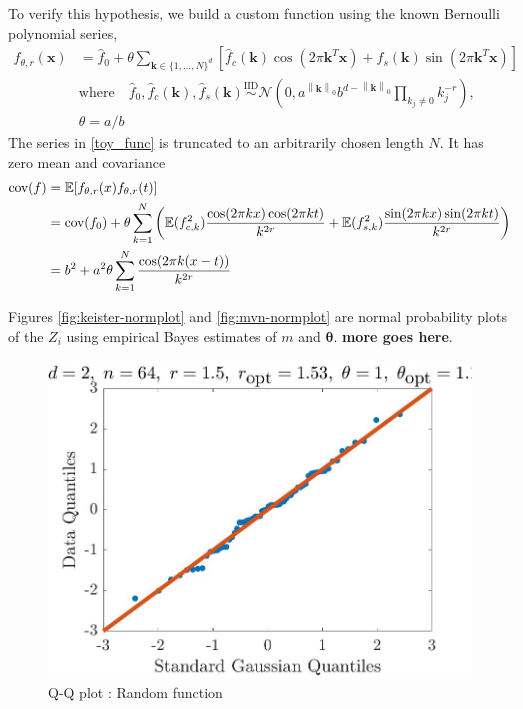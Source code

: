 \documentclass{svjour3}                     %
\newcommand{\bm}[1]{\boldsymbol{#1}}
\newcommand{\Ex}{\mathbb{E}}
\newcommand{\vtheta}{{\bm{\theta}}}
\newcommand{\vk}{\bm{k}}
\newcommand{\vx}{\bm{x}}
\newcommand{\cov}{{\textup{cov}}}
\newcommand{\calN}{\mathcal{N}}
\newcommand{\norm}[2][{}]{\ensuremath{\left \lVert #2 \right \rVert}_{#1}}
\begin{document}
To verify this hypothesis, we build a custom function using the known Bernoulli polynomial series,
\begin{align}
\label{toy_func}
f_{\theta, r}(\vx) & = \widehat{f}_0 + \theta \sum_{\vk \in \lbrace 1, \dots, N \rbrace^d}
\left[\widehat{f}_{c}(\vk) \cos(2\pi \vk^T \vx) + \widehat{f}_{s}(\vk) \sin(2\pi \vk^T \vx)\right]
\\
\nonumber
& \text{where} \quad 
\widehat{f}_0, \widehat{f}_{c}(\vk), \widehat{f}_{s}(\vk) \overset{\text{IID}}{\sim} \calN(0, a^{\norm[0]{\vk}} b^{d-\norm[0]{\vk}} \prod_{k_j \ne 0} k_j^{-r} ), 
\\
\nonumber
&\theta = a/b
\end{align}
The series in \eqref{toy_func} is truncated to an arbitrarily chosen length $N$. It has zero mean and covariance
\begin{align*}
\cov(f) &= \Ex[f_{\theta, r}(x) f_{\theta, r}(t)] \\
&= \cov(f_0) + \theta \sum_{k=1}^N 
\left(	
\Ex(f_{c,k}^2) \frac{\cos(2\pi k x) \cos(2\pi k t)}{k^{2r}} +
\Ex(f_{s,k}^2) \frac{\sin(2\pi k x) \sin(2\pi k t)}{k^{2r}} \right) \\
&= b^2 + a^2 \theta \sum_{k=1}^N 	
\frac{\cos(2\pi k (x - t)) }{k^{2r}} 
\end{align*}



Figures \ref{fig:keister-normplot} and \ref{fig:mvn-normplot} are normal probability plots of the $Z_i$ using empirical Bayes estimates of $m$ and $\vtheta$. \textbf{more goes here}.





\begin{figure}[ht]
	\centering
	\includegraphics[width=0.9\linewidth]{"figures/rand-QQPlot-n-64-d-2-r-150-th-100-1"}
	\caption{Q-Q plot : Random function}
	\label{fig:randf-normplot}
\end{figure}
\end{document}

